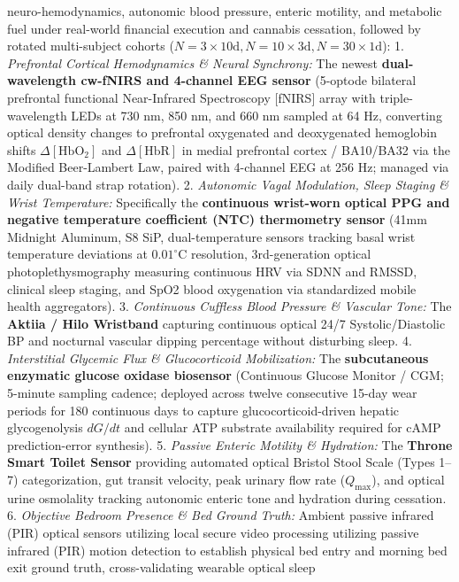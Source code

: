 \documentclass[
]{article}
\begin{document}
neuro-hemodynamics, autonomic blood pressure, enteric motility, and
metabolic fuel under real-world financial execution and cannabis
cessation, followed by rotated multi-subject cohorts
(\(N=3\times 10\text{d}, N=10\times 3\text{d}, N=30\times 1\text{d}\)):
1. \emph{Prefrontal Cortical Hemodynamics \& Neural Synchrony:} The
newest \textbf{dual-wavelength cw-fNIRS and 4-channel EEG sensor}
(5-optode bilateral prefrontal functional Near-Infrared Spectroscopy
{[}fNIRS{]} array with triple-wavelength LEDs at 730 nm, 850 nm, and 660
nm sampled at 64 Hz, converting optical density changes to prefrontal
oxygenated and deoxygenated hemoglobin shifts
\(\Delta [\mathrm{HbO}_2]\) and \(\Delta [\mathrm{HbR}]\) in medial
prefrontal cortex / BA10/BA32 via the Modified Beer-Lambert Law, paired
with 4-channel EEG at 256 Hz; managed via daily dual-band strap
rotation). 2. \emph{Autonomic Vagal Modulation, Sleep Staging \& Wrist
Temperature:} Specifically the \textbf{continuous wrist-worn optical PPG
and negative temperature coefficient (NTC) thermometry sensor} (41mm
Midnight Aluminum, S8 SiP, dual-temperature sensors tracking basal wrist
temperature deviations at \(0.01^\circ\mathrm{C}\) resolution,
3rd-generation optical photoplethysmography measuring continuous HRV via
SDNN and RMSSD, clinical sleep staging, and SpO2 blood oxygenation via
standardized mobile health aggregators). 3. \emph{Continuous Cuffless
Blood Pressure \& Vascular Tone:} The \textbf{Aktiia / Hilo Wristband}
capturing continuous optical 24/7 Systolic/Diastolic BP and nocturnal
vascular dipping percentage without disturbing sleep. 4.
\emph{Interstitial Glycemic Flux \& Glucocorticoid Mobilization:} The
\textbf{subcutaneous enzymatic glucose oxidase biosensor} (Continuous
Glucose Monitor / CGM; 5-minute sampling cadence; deployed across twelve
consecutive 15-day wear periods for 180 continuous days to capture
glucocorticoid-driven hepatic glycogenolysis \(dG/dt\) and cellular ATP
substrate availability required for cAMP prediction-error synthesis). 5.
\emph{Passive Enteric Motility \& Hydration:} The \textbf{Throne Smart
Toilet Sensor} providing automated optical Bristol Stool Scale (Types
1--7) categorization, gut transit velocity, peak urinary flow rate
(\(Q_{\text{max}}\)), and optical urine osmolality tracking autonomic
enteric tone and hydration during cessation. 6. \emph{Objective Bedroom
Presence \& Bed Ground Truth:} Ambient passive infrared (PIR) optical
sensors utilizing local secure video processing utilizing passive
infrared (PIR) motion detection to establish physical bed entry and
morning bed exit ground truth, cross-validating wearable optical sleep
\end{document}
